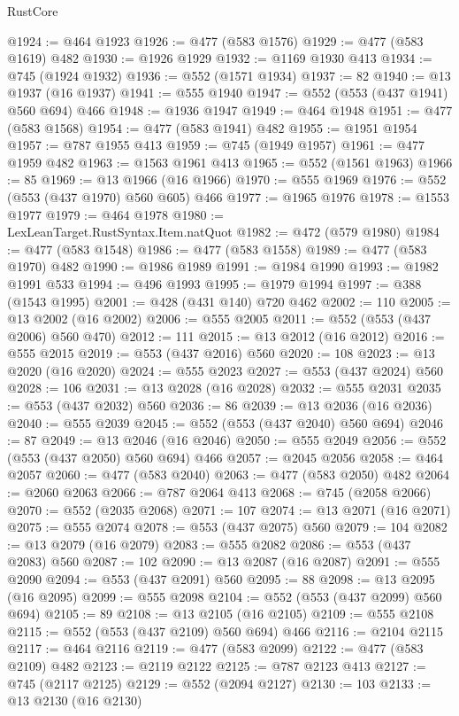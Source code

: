 \begin{lexlean}{RustCore}
\begin{coremodule}
@1924 := @464 @1923
@1926 := @477 (@583 @1576)
@1929 := @477 (@583 @1619) @482
@1930 := @1926 @1929
@1932 := @1169 @1930 @413
@1934 := @745 (@1924 @1932)
@1936 := @552 (@1571 @1934)
@1937 := 82
@1940 := @13 @1937 (@16 @1937)
@1941 := @555 @1940
@1947 := @552 (@553 (@437 @1941) @560 @694) @466
@1948 := @1936 @1947
@1949 := @464 @1948
@1951 := @477 (@583 @1568)
@1954 := @477 (@583 @1941) @482
@1955 := @1951 @1954
@1957 := @787 @1955 @413
@1959 := @745 (@1949 @1957)
@1961 := @477 @1959 @482
@1963 := @1563 @1961 @413
@1965 := @552 (@1561 @1963)
@1966 := 85
@1969 := @13 @1966 (@16 @1966)
@1970 := @555 @1969
@1976 := @552 (@553 (@437 @1970) @560 @605) @466
@1977 := @1965 @1976
@1978 := @1553 @1977
@1979 := @464 @1978
@1980 := LexLeanTarget.RustSyntax.Item.natQuot
@1982 := @472 (@579 @1980)
@1984 := @477 (@583 @1548)
@1986 := @477 (@583 @1558)
@1989 := @477 (@583 @1970) @482
@1990 := @1986 @1989
@1991 := @1984 @1990
@1993 := @1982 @1991 @533
@1994 := @496 @1993
@1995 := @1979 @1994
@1997 := @388 (@1543 @1995)
@2001 := @428 (@431 @140) @720 @462
@2002 := 110
@2005 := @13 @2002 (@16 @2002)
@2006 := @555 @2005
@2011 := @552 (@553 (@437 @2006) @560 @470)
@2012 := 111
@2015 := @13 @2012 (@16 @2012)
@2016 := @555 @2015
@2019 := @553 (@437 @2016) @560
@2020 := 108
@2023 := @13 @2020 (@16 @2020)
@2024 := @555 @2023
@2027 := @553 (@437 @2024) @560
@2028 := 106
@2031 := @13 @2028 (@16 @2028)
@2032 := @555 @2031
@2035 := @553 (@437 @2032) @560
@2036 := 86
@2039 := @13 @2036 (@16 @2036)
@2040 := @555 @2039
@2045 := @552 (@553 (@437 @2040) @560 @694)
@2046 := 87
@2049 := @13 @2046 (@16 @2046)
@2050 := @555 @2049
@2056 := @552 (@553 (@437 @2050) @560 @694) @466
@2057 := @2045 @2056
@2058 := @464 @2057
@2060 := @477 (@583 @2040)
@2063 := @477 (@583 @2050) @482
@2064 := @2060 @2063
@2066 := @787 @2064 @413
@2068 := @745 (@2058 @2066)
@2070 := @552 (@2035 @2068)
@2071 := 107
@2074 := @13 @2071 (@16 @2071)
@2075 := @555 @2074
@2078 := @553 (@437 @2075) @560
@2079 := 104
@2082 := @13 @2079 (@16 @2079)
@2083 := @555 @2082
@2086 := @553 (@437 @2083) @560
@2087 := 102
@2090 := @13 @2087 (@16 @2087)
@2091 := @555 @2090
@2094 := @553 (@437 @2091) @560
@2095 := 88
@2098 := @13 @2095 (@16 @2095)
@2099 := @555 @2098
@2104 := @552 (@553 (@437 @2099) @560 @694)
@2105 := 89
@2108 := @13 @2105 (@16 @2105)
@2109 := @555 @2108
@2115 := @552 (@553 (@437 @2109) @560 @694) @466
@2116 := @2104 @2115
@2117 := @464 @2116
@2119 := @477 (@583 @2099)
@2122 := @477 (@583 @2109) @482
@2123 := @2119 @2122
@2125 := @787 @2123 @413
@2127 := @745 (@2117 @2125)
@2129 := @552 (@2094 @2127)
@2130 := 103
@2133 := @13 @2130 (@16 @2130)

\end{coremodule}
\end{lexlean}
